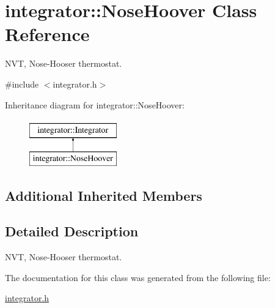 \hypertarget{classintegrator_1_1NoseHoover}{\section{integrator\-:\-:Nose\-Hoover Class Reference}
\label{classintegrator_1_1NoseHoover}
}


N\-V\-T, Nose-\/\-Hooser thermostat.  




{\ttfamily \#include $<$integrator.\-h$>$}

Inheritance diagram for integrator\-:\-:Nose\-Hoover\-:\begin{figure}[H]
\begin{center}
\leavevmode
\includegraphics[height=2.000000cm]{classintegrator_1_1NoseHoover}
\end{center}
\end{figure}
\subsection*{Additional Inherited Members}


\subsection{Detailed Description}
N\-V\-T, Nose-\/\-Hooser thermostat. 

The documentation for this class was generated from the following file\-:\begin{DoxyCompactItemize}
\item 
\hyperlink{integrator_8h}{integrator.\-h}\end{DoxyCompactItemize}

